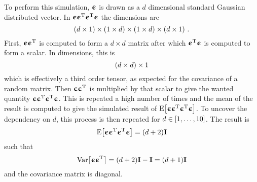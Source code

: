 To perform this simulation, ${\boldsymbol{\upepsilon}}$ is drawn as a $d$ dimensional standard Gaussian distributed vector. In ${\boldsymbol{\upepsilon}}{\boldsymbol{\upepsilon}}{^\mathrm{T}}{\boldsymbol{\upepsilon}}{^\mathrm{T}}{\boldsymbol{\upepsilon}}$ the dimensions are
\begin{equation}
    {\left(d\times1\right)}\times{\left(1\times d\right)}\times{\left(1\times d\right)}\times{\left(d\times1\right)} \ .
\end{equation}
First, ${\boldsymbol{\upepsilon}}{\boldsymbol{\upepsilon}}{^\mathrm{T}}$ is computed to form a $d\times d$ matrix after which ${\boldsymbol{\upepsilon}}{^\mathrm{T}}{\boldsymbol{\upepsilon}}$ is computed to form a scalar. In dimensions, this is 
\begin{equation}
    {\left(d\times d\right)} \times 1
\end{equation}
which is effectively a third order tensor, as expected for the covariance of a random matrix.
Then ${\boldsymbol{\upepsilon}}{\boldsymbol{\upepsilon}}{^\mathrm{T}}$ is multiplied by that scalar to give the wanted quantity ${\boldsymbol{\upepsilon}}{\boldsymbol{\upepsilon}}{^\mathrm{T}}{\boldsymbol{\upepsilon}}{^\mathrm{T}}{\boldsymbol{\upepsilon}}$. This is repeated a high number of times and the mean of the result is computed to give the simulated result of $\text{E}{\left[{\boldsymbol{\upepsilon}}{\boldsymbol{\upepsilon}}{^\mathrm{T}}{\boldsymbol{\upepsilon}}{^\mathrm{T}}{\boldsymbol{\upepsilon}}\right]}$. To uncover the dependency on $d$, this process is then repeated for $d\in{\left[1,\dots, 10\right]}$. The result is 
\begin{equation}
    \text{E}{\left[{\boldsymbol{\upepsilon}}{\boldsymbol{\upepsilon}}{^\mathrm{T}}{\boldsymbol{\upepsilon}}{^\mathrm{T}}{\boldsymbol{\upepsilon}}\right]} = (d+2){\mathbf{I}}
\end{equation}
such that 
\begin{equation}
    \text{Var}{\left[{\boldsymbol{\upepsilon}}{\boldsymbol{\upepsilon}}{^\mathrm{T}}\right]} = (d+2){\mathbf{I}} - {\mathbf{I}} = (d+1){\mathbf{I}}
\end{equation}
and the covariance matrix is diagonal.





        

